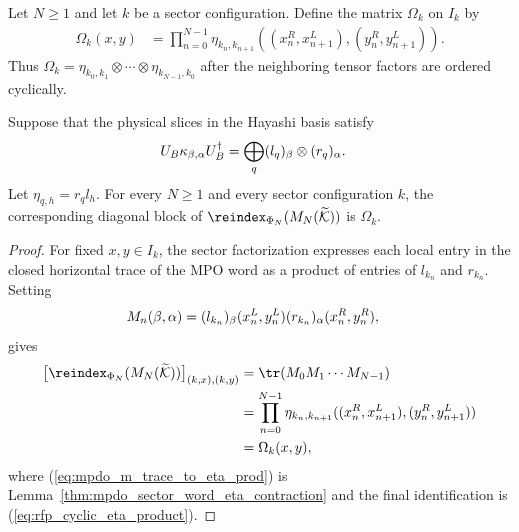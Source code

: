 \begin{definition}
    \label{def:mpdo_cyclic_eta_tensor_product}
    \leanok
    Let $N\geq1$ and let $k$ be a sector configuration. Define the matrix
    $\Omega_k$ on $I_k$ by
    \begin{align}
        \Omega_k(x,y)
         & =\prod_{n=0}^{N-1}
        \eta_{k_n,k_{n+1}}
        ((x_n^R,x_{n+1}^L),(y_n^R,y_{n+1}^L)).
        \label{eq:rfp_cyclic_eta_product}
    \end{align}
    Thus
    $\Omega_k=\eta_{k_0,k_1}\otimes\cdots\otimes
        \eta_{k_{N-1},k_0}$ after the neighboring tensor factors are ordered
    cyclically.
\end{definition}

\begin{lemma}
    \label{thm:mpdo_fixed_sector_cyclic_eta}
    \leanok
    Suppose that the physical slices in the Hayashi basis satisfy
    \begin{align}
        U_B\kappa_{\beta,\alpha}U_B^\dagger
         & =\bigoplus_q(l_q)_\beta\otimes(r_q)_\alpha. \notag
    \end{align}
    Let $\eta_{q,h}=r_q l_h$. For every $N\geq1$ and every sector
    configuration $k$, the corresponding diagonal block of
    $\reindex_{\Phi_N}(M_N(\widetilde{\cal K}))$ is $\Omega_k$.
\end{lemma}

\begin{proof}
    \leanok
    For fixed $x,y\in I_k$, the sector factorization expresses each local entry
    in the closed horizontal trace of the MPO word as a product of entries of
    $l_{k_n}$ and $r_{k_n}$. Setting
    \begin{align}
        M_n(\beta,\alpha)
         & =(l_{k_n})_\beta(x_n^L,y_n^L)
        (r_{k_n})_\alpha(x_n^R,y_n^R), \notag
    \end{align}
    gives
    \begin{align}
        \bigl[\reindex_{\Phi_N}
            (M_N(\widetilde{\cal K}))\bigr]_{(k,x),(k,y)}
         & =\tr(M_0M_1\cdots M_{N-1}) \notag    \\
         & =\prod_{n=0}^{N-1}\eta_{k_n,k_{n+1}}
        ((x_n^R,x_{n+1}^L),(y_n^R,y_{n+1}^L))
        \label{eq:mpdo_m_trace_to_eta_prod}     \\
         & =\Omega_k(x,y), \notag
    \end{align}
    where (\ref{eq:mpdo_m_trace_to_eta_prod}) is
    Lemma~\ref{thm:mpdo_sector_word_eta_contraction} and the final identification is
    (\ref{eq:rfp_cyclic_eta_product}).
\end{proof}

